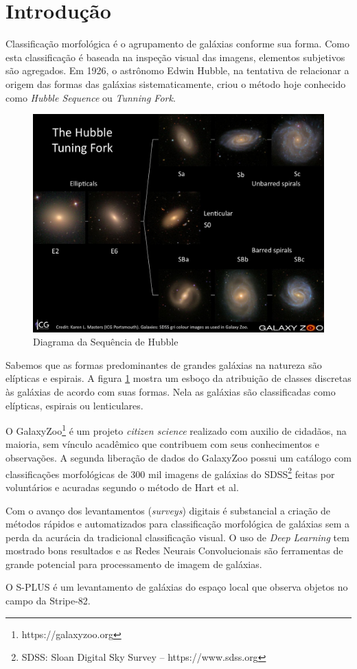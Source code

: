\section*{Introdução}

Classificação morfológica é o agrupamento de galáxias conforme sua forma. Como esta classificação é baseada na inspeção visual das imagens, elementos subjetivos são agregados. Em 1926, o astrônomo Edwin Hubble, na tentativa de relacionar a origem das formas das galáxias sistematicamente, criou o método hoje conhecido como \emph{Hubble Sequence} ou \emph{Tunning Fork}. \cite{hubble1926, fortson2012}

\begin{figure}[h!]
    \centering
    \includegraphics[width=.8\textwidth]{figures/tuningfork1.jpg}
    \caption{Diagrama da Sequência de Hubble}
    \label{fig:tuningfork}
\end{figure}

Sabemos que as formas predominantes de grandes galáxias na natureza são elípticas e espirais. A figura \ref{fig:tuningfork} mostra um esboço da atribuição de classes discretas às galáxias de acordo com suas formas. Nela as galáxias são classificadas como elípticas, espirais ou lenticulares. \cite{fortson2012}

O GalaxyZoo\footnote{https://galaxyzoo.org} é um projeto \emph{citizen science} realizado com auxilio de cidadãos, na maioria, sem vínculo acadêmico que contribuem com seus conhecimentos e observações. A segunda liberação de dados do GalaxyZoo possui um catálogo com classificações morfológicas de 300 mil imagens de galáxias do SDSS\footnote{SDSS: Sloan Digital Sky Survey -- https://www.sdss.org} feitas por voluntários e acuradas segundo o método de Hart et al. \cite{hart2016}

Com o avanço dos levantamentos (\emph{surveys}) digitais é substancial a criação de métodos rápidos e automatizados para classificação morfológica de galáxias sem a perda da acurácia da tradicional classificação visual. \cite{yamauchi2005} O uso de \emph{Deep Learning} tem mostrado bons resultados e as Redes Neurais Convolucionais são ferramentas de grande potencial para processamento de imagem de galáxias. \cite{barchi2020, dai2018}

O S-PLUS \cite{oliveira2019} é um levantamento de galáxias do espaço local que observa objetos no campo da Stripe-82.
